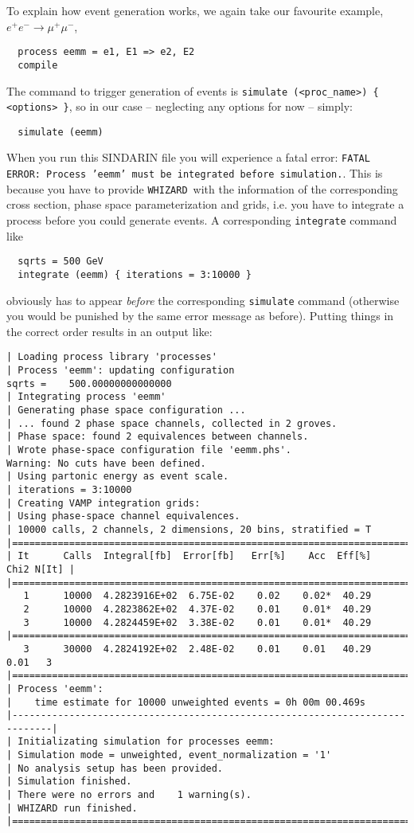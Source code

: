 \documentclass[12pt]{book}
\newcommand{\ttt}[1]{\texttt{#1}}
\newcommand{\whizard}{\texttt{WHIZARD}}
\begin{document}
To explain how event generation works, we again take our favourite
example, $e^+e^- \to \mu^+ \mu^-$,
\begin{verbatim}
  process eemm = e1, E1 => e2, E2
  compile
\end{verbatim}
The command to trigger generation of events is \ttt{simulate
  (<proc\_name>) \{ <options> \}}, so in our case -- neglecting any
options for now -- simply:
\begin{verbatim}
  simulate (eemm)
\end{verbatim}
When you run this SINDARIN file you will experience a fatal error:
\ttt{FATAL ERROR: Process 'eemm' must be integrated before simulation.}.
This is because you have to provide \whizard\ with the information of
the corresponding cross section, phase space parameterization and
grids, i.e. you have to integrate a process before you could generate
events. A corresponding \ttt{integrate} command like
\begin{verbatim}
  sqrts = 500 GeV
  integrate (eemm) { iterations = 3:10000 }
\end{verbatim}
obviously has to appear {\em before} the corresponding \ttt{simulate}
command (otherwise you would be punished by the same error message as
before). Putting things in the correct order results in an output
like:
\begin{footnotesize}
\begin{verbatim}
| Loading process library 'processes'
| Process 'eemm': updating configuration
sqrts =    500.00000000000000
| Integrating process 'eemm'
| Generating phase space configuration ...
| ... found 2 phase space channels, collected in 2 groves.
| Phase space: found 2 equivalences between channels.
| Wrote phase-space configuration file 'eemm.phs'.
Warning: No cuts have been defined.
| Using partonic energy as event scale.
| iterations = 3:10000
| Creating VAMP integration grids:
| Using phase-space channel equivalences.
| 10000 calls, 2 channels, 2 dimensions, 20 bins, stratified = T
|=============================================================================|
| It      Calls  Integral[fb]  Error[fb]   Err[%]    Acc  Eff[%]   Chi2 N[It] |
|=============================================================================|
   1      10000  4.2823916E+02  6.75E-02    0.02    0.02*  40.29
   2      10000  4.2823862E+02  4.37E-02    0.01    0.01*  40.29
   3      10000  4.2824459E+02  3.38E-02    0.01    0.01*  40.29
|=============================================================================|
   3      30000  4.2824192E+02  2.48E-02    0.01    0.01   40.29    0.01   3
|=============================================================================|
| Process 'eemm':
|    time estimate for 10000 unweighted events = 0h 00m 00.469s
|-----------------------------------------------------------------------------|
| Initializating simulation for processes eemm:
| Simulation mode = unweighted, event_normalization = '1'
| No analysis setup has been provided.
| Simulation finished.
| There were no errors and    1 warning(s).
| WHIZARD run finished.
|=============================================================================|
\end{verbatim}
\end{footnotesize}
\end{document}
